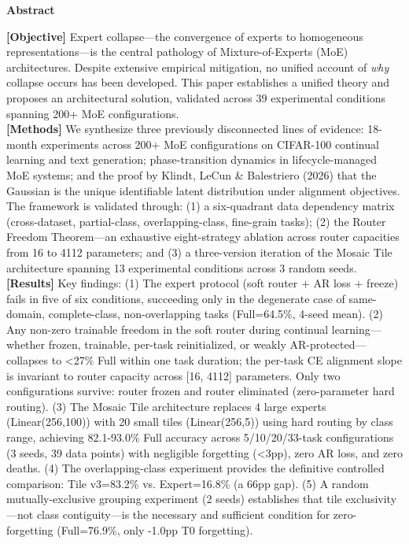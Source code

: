 \documentclass[twoside]{article}
\theoremstyle{definition}
\begin{document}
\begin{center}
{\bfseries{} Abstract}
\end{center}

{
{\bf [Objective]} Expert collapse---the convergence of experts to homogeneous representations---is the central pathology of Mixture-of-Experts (MoE) architectures. Despite extensive empirical mitigation, no unified account of \emph{why} collapse occurs has been developed. This paper establishes a unified theory and proposes an architectural solution, validated across 39 experimental conditions spanning 200+ MoE configurations.\\

{\bf [Methods]} We synthesize three previously disconnected lines of evidence: 18-month experiments across 200+ MoE configurations on CIFAR-100 continual learning and text generation; phase-transition dynamics in lifecycle-managed MoE systems; and the proof by Klindt, LeCun \& Balestriero (2026) that the Gaussian is the unique identifiable latent distribution under alignment objectives. The framework is validated through: (1) a six-quadrant data dependency matrix (cross-dataset, partial-class, overlapping-class, fine-grain tasks); (2) the Router Freedom Theorem---an exhaustive eight-strategy ablation across router capacities from 16 to 4112 parameters; and (3) a three-version iteration of the Mosaic Tile architecture spanning 13 experimental conditions across 3 random seeds.\\

{\bf [Results]} Key findings: (1) The expert protocol (soft router + AR loss + freeze) fails in five of six conditions, succeeding only in the degenerate case of same-domain, complete-class, non-overlapping tasks (Full=64.5\%, 4-seed mean). (2) Any non-zero trainable freedom in the soft router during continual learning---whether frozen, trainable, per-task reinitialized, or weakly AR-protected---collapses to <27\% Full within one task duration; the per-task CE alignment slope is invariant to router capacity across [16, 4112] parameters. Only two configurations survive: router frozen and router eliminated (zero-parameter hard routing). (3) The Mosaic Tile architecture replaces 4 large experts (Linear(256,100)) with 20 small tiles (Linear(256,5)) using hard routing by class range, achieving 82.1-93.0\% Full accuracy across 5/10/20/33-task configurations (3 seeds, 39 data points) with negligible forgetting (<3pp), zero AR loss, and zero deaths. (4) The overlapping-class experiment provides the definitive controlled comparison: Tile v3=83.2\% vs. Expert=16.8\% (a 66pp gap). (5) A random mutually-exclusive grouping experiment (2 seeds) establishes that tile exclusivity---not class contiguity---is the necessary and sufficient condition for zero-forgetting (Full=76.9\%, only -1.0pp T0 forgetting).\\

}
\end{document}
